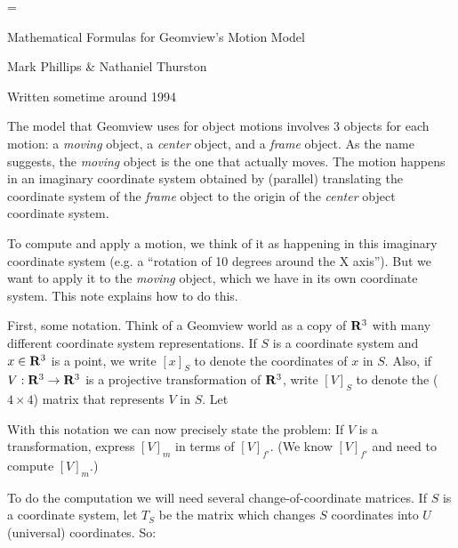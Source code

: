 \magnification=

\centerline{Mathematical Formulas for Geomview's Motion Model}
\centerline{Mark Phillips \& Nathaniel Thurston}
\centerline{Written sometime around 1994}

\bigskip

The model that Geomview uses for object motions involves 3 objects
for each motion: a {\it moving} object, a {\it center} object,
and a {\it frame} object.  As the name suggests, the {\it moving}
object is the one that actually moves.  The motion happens in
an imaginary coordinate system obtained by (parallel) translating
the coordinate system of the {\it frame} object to the origin
of the {\it center} object coordinate system.

To compute and apply a motion, we think of it as happening in
this imaginary coordinate system (e.g. a ``rotation of 10 degrees around
the X axis'').  But we want to apply it to the {\it moving} object,
which we have in its own coordinate system.  This note explains
how to do this.

First, some notation.
Think of a Geomview world as a copy of ${\bf R}^3$
with many different coordinate system representations.  If $S$ is a
coordinate system and $x \in {\bf R}^3$ is a point, we write $[x]_S$
to denote the coordinates of $x$ in $S$.  Also, if $V: {\bf R}^3
\rightarrow {\bf R}^3$ is a projective transformation of ${\bf R}^3$,
write $[V]_S$ to denote the ($4 \times 4$) matrix that represents
$V$ in $S$.  Let

\smallskip
{}
\smallskip

With this notation we can now precisely state the problem: If $V$ is a
transformation, express $[V]_m$ in terms of $[V]_{f'}$.  (We know
$[V]_{f'}$ and need to compute $[V]_m$.)

To do the computation we will need several change-of-coordinate
matrices.  If $S$ is a coordinate system, let $T_S$ be the matrix
which changes $S$ coordinates into $U$ (universal) coordinates.  So:

\smallskip
{}
\smallskip

